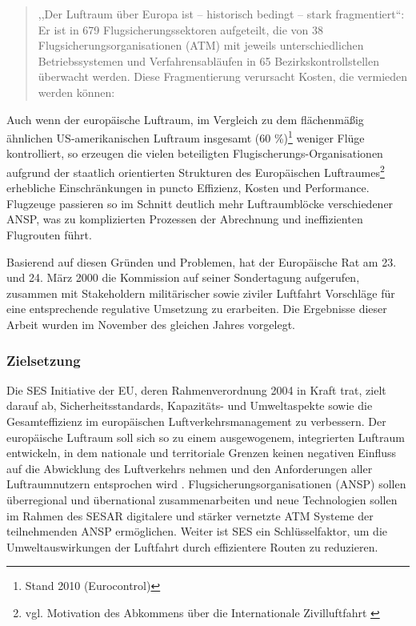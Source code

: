 
    \begin{quote}
        ,,Der Luftraum über Europa ist – historisch bedingt – stark fragmentiert``:  Er ist in 679 Flugsicherungssektoren aufgeteilt, die von 38 Flugsicherungsorganisationen (ATM) mit jeweils unterschiedlichen
        Betriebssystemen und Verfahrensabläufen in 65 Bezirkskontrollstellen überwacht werden. Diese Fragmentierung verursacht Kosten, die vermieden werden können:
        \cite[S.6]{eu_ses_studie} 
    \end{quote}
        
    \noindent
    Auch wenn der europäische Luftraum, im Vergleich zu dem flächenmäßig ähnlichen US-amerikanischen Luftraum insgesamt (60 \%)\footnote{Stand 2010 (Eurocontrol)} weniger Flüge kontrolliert, so erzeugen die vielen beteiligten Flugischerungs-Organisatio\-nen aufgrund der staatlich orientierten Strukturen des Europäischen Luftraumes\footnote{vgl. Motivation des Abkommens über die Internationale Zivilluftfahrt \cite{icao_convention}} erhebliche Einschränkungen in puncto Effizienz, Kosten und Performance.
    Flugzeuge passieren so im Schnitt deutlich mehr Luftraumblöcke verschiedener \ac{ANSP}, was zu komplizierten Prozessen der Abrechnung und ineffizienten Flugrouten führt.  
    \cite[S. 74]{eu_ses_fab}

    \medskip
    Basierend auf diesen Gründen und Problemen, hat der Europäische Rat am 23. und 24. März 2000 die Kommission auf seiner Sondertagung aufgerufen, zusammen mit Stakeholdern militärischer sowie ziviler Luftfahrt Vorschläge für eine entsprechende regulative Umsetzung zu erarbeiten.
    Die Ergebnisse dieser Arbeit wurden im November des gleichen Jahres vorgelegt.
    \cite[ErwG. 2]{2004R0549}
    
\subsubsection{Zielsetzung}

    Die \acf{SES} Initiative der \acf{EU}, deren Rahmenverordnung 2004 in Kraft trat, zielt darauf ab, Sicherheitsstandards, Ka\-pazitäts- und Umweltaspekte sowie die Gesamteffizienz im europäischen Luftverkehrsmanagement zu verbessern.
    Der europäische Luftraum soll sich so zu einem ausgewogenem, integrierten Luftraum entwickeln, in dem nationale und territoriale Grenzen keinen negativen Einfluss auf die Abwicklung des Luftverkehrs nehmen und den Anforderungen aller Luftraumnutzern entsprochen wird 
    \cite[Art. 1 Abs. 1]{2004R0549}.
    Flugsicherungsorganisationen (\acs{ANSP}) sollen überregional und übernational zusammenarbeiten und neue Technologien sollen im Rahmen des \acf{SESAR} digitalere und stärker vernetzte \acs{ATM} Systeme der teilnehmenden \ac{ANSP} ermöglichen.
    Weiter ist \acs{SES} ein Schlüsselfaktor, um die Umweltauswirkungen der Luftfahrt durch effizientere Routen zu reduzieren.  

